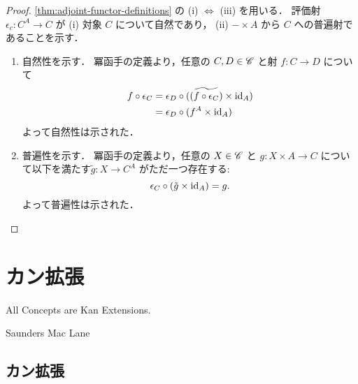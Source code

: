 \documentclass[titlepage]{ltjsreport}
\begin{document}
\begin{proof}
  \cref{thm:adjoint-functor-definitions} の (i) $\Leftrightarrow$ (iii) を用いる．
  評価射 $\epsilon_c:{C}^A\to C$ が
  (i) 対象 $C$ について自然であり，
  (ii) $-\times A$ から $C$ への普遍射であることを示す．

  \begin{enumerate}[label=(\roman*)] %
    \item 自然性を示す．
          冪函手の定義より，任意の $C,D\in\mathscr{C}$ と射 $f:C\to D$ について
          \begin{align*}
            f\circ\epsilon_C
             & =\epsilon_D\circ(\widetilde{(f\circ\epsilon_C)}\times\mathrm{id}_{A}) \\
             & =\epsilon_D\circ(f^A\times\mathrm{id}_{A})                            \\
          \end{align*}
          よって自然性は示された．
    \item 普遍性を示す．
          冪函手の定義より，任意の $X\in\mathscr{C}$ と $g:X\times A\to C$
          について以下を満たす$\tilde{g}:X\to C^A$ がただ一つ存在する:
          \begin{equation*}
            \epsilon_C\circ(\tilde{g}\times\mathrm{id}_{A})=g.
          \end{equation*}
          よって普遍性は示された．
  \end{enumerate}
\end{proof}

\chapter{カン拡張}

\epigraph{All Concepts are Kan Extensions.}{Saunders Mac Lane}

\section{カン拡張}
\end{document}
